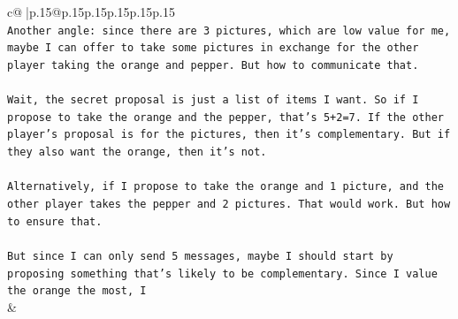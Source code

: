 \documentclass{article}
\begin{document}
{\begin{supertabular}{c@{$\;$}|p{.15\linewidth}@{}p{.15\linewidth}p{.15\linewidth}p{.15\linewidth}p{.15\linewidth}p{.15\linewidth}}
{{{\\ 
\texttt{Another angle: since there are 3 pictures, which are low value for me, maybe I can offer to take some pictures in exchange for the other player taking the orange and pepper. But how to communicate that. } \\
\\ 
\texttt{Wait, the secret proposal is just a list of items I want. So if I propose to take the orange and the pepper, that's 5+2=7. If the other player's proposal is for the pictures, then it's complementary. But if they also want the orange, then it's not. } \\
\\ 
\texttt{Alternatively, if I propose to take the orange and 1 picture, and the other player takes the pepper and 2 pictures. That would work. But how to ensure that. } \\
\\ 
\texttt{But since I can only send 5 messages, maybe I should start by proposing something that's likely to be complementary. Since I value the orange the most, I} \\
            }
        }
    }
    & \\ \\


\end{supertabular}}
\end{document}
